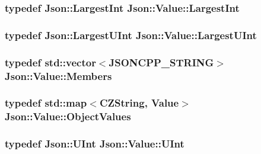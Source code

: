 \subsubsection[{\texorpdfstring{Largest\+Int}{LargestInt}}]{\setlength{\rightskip}{0pt plus 5cm}typedef {\bf Json\+::\+Largest\+Int} {\bf Json\+::\+Value\+::\+Largest\+Int}}\hypertarget{classJson_1_1Value_a1cbb82642ed05109b9833e49f042ece7}{}\label{classJson_1_1Value_a1cbb82642ed05109b9833e49f042ece7}
\subsubsection[{\texorpdfstring{Largest\+U\+Int}{LargestUInt}}]{\setlength{\rightskip}{0pt plus 5cm}typedef {\bf Json\+::\+Largest\+U\+Int} {\bf Json\+::\+Value\+::\+Largest\+U\+Int}}\hypertarget{classJson_1_1Value_a6682a3684d635e03fc06ba229fa24eec}{}\label{classJson_1_1Value_a6682a3684d635e03fc06ba229fa24eec}
\subsubsection[{\texorpdfstring{Members}{Members}}]{\setlength{\rightskip}{0pt plus 5cm}typedef std\+::vector$<${\bf J\+S\+O\+N\+C\+P\+P\+\_\+\+S\+T\+R\+I\+NG}$>$ {\bf Json\+::\+Value\+::\+Members}}\hypertarget{classJson_1_1Value_a9ae9069983fc38f1928d76f9c79ac64d}{}\label{classJson_1_1Value_a9ae9069983fc38f1928d76f9c79ac64d}
\subsubsection[{\texorpdfstring{Object\+Values}{ObjectValues}}]{\setlength{\rightskip}{0pt plus 5cm}typedef std\+::map$<${\bf C\+Z\+String}, {\bf Value}$>$ {\bf Json\+::\+Value\+::\+Object\+Values}}\hypertarget{classJson_1_1Value_a08b6c80c3af7071d908dabf044de5388}{}\label{classJson_1_1Value_a08b6c80c3af7071d908dabf044de5388}
\subsubsection[{\texorpdfstring{U\+Int}{UInt}}]{\setlength{\rightskip}{0pt plus 5cm}typedef {\bf Json\+::\+U\+Int} {\bf Json\+::\+Value\+::\+U\+Int}}\hypertarget{classJson_1_1Value_a0933d59b45793ae4aade1757c322a98d}{}\label{classJson_1_1Value_a0933d59b45793ae4aade1757c322a98d}
